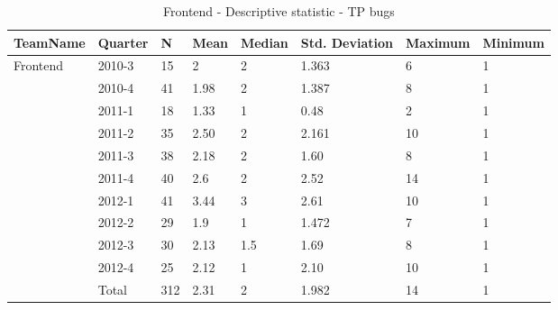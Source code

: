 \documentclass[UKenglish]{ifimaster}  %
\begin{document}
 \begin{table}[!htbp]
\begin{tabular}{ | l | l | l | l | l | l | l | l | }
\hline
TeamName & Quarter & N & Mean & Median & Std. Deviation & Maximum & Minimum \\ \hline
	Frontend & 2010-3 & 15 & 2 & 2 & 1.363 & 6 & 1 \\ \hline
	 & 2010-4 & 41 & 1.98 & 2 & 1.387 & 8 & 1 \\ \hline
	 & 2011-1 & 18 & 1.33 & 1 & 0.48 & 2 & 1 \\ \hline
	 & 2011-2 & 35 & 2.50 & 2 & 2.161 & 10 & 1 \\ \hline
	 & 2011-3 & 38 & 2.18 & 2 & 1.60 & 8 & 1 \\ \hline
	 & 2011-4 & 40 & 2.6 & 2 & 2.52 & 14 & 1 \\ \hline
	 & 2012-1 & 41 & 3.44 & 3 & 2.61 & 10 & 1 \\ \hline
	 & 2012-2 & 29 & 1.9 & 1 & 1.472 & 7 & 1 \\ \hline
	 & 2012-3 & 30 & 2.13 & 1.5 & 1.69 & 8 & 1 \\ \hline
	 & 2012-4 & 25 & 2.12 & 1 & 2.10 & 10 & 1 \\ \hline
	 & Total & 312 & 2.31 & 2 & 1.982 & 14 & 1 \\ \hline
 	 \end{tabular}
  	  \caption{Frontend - Descriptive statistic - TP bugs }%
\end{table}
\end{document}
